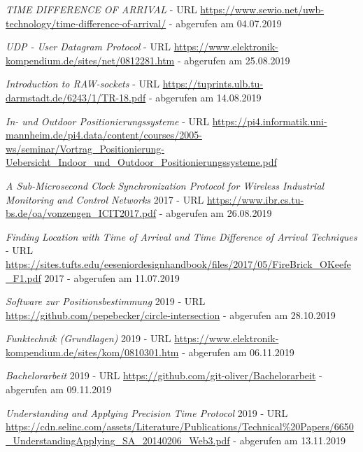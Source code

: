 \begin{thebibliography}{}
	\textit{TIME DIFFERENCE OF ARRIVAL} - URL \url{https://www.sewio.net/uwb-technology/time-difference-of-arrival/} - abgerufen am 04.07.2019	


	\textit{UDP - User Datagram Protocol} - URL \url{https://www.elektronik-kompendium.de/sites/net/0812281.htm} - abgerufen am 25.08.2019	

	\textit{Introduction to RAW-sockets} - URL \url{https://tuprints.ulb.tu-darmstadt.de/6243/1/TR-18.pdf} - abgerufen am 14.08.2019	

	\textit{In- und Outdoor
Positionierungssysteme} - URL \url{https://pi4.informatik.uni-mannheim.de/pi4.data/content/courses/2005-ws/seminar/Vortrag_Positionierung-Uebersicht_Indoor_und_Outdoor_Positionierungssysteme.pdf} 

	\textit{A Sub-Microsecond Clock Synchronization Protocol for Wireless Industrial Monitoring and Control Networks} 2017 - URL \url{https://www.ibr.cs.tu-bs.de/oa/vonzengen_ICIT2017.pdf} - abgerufen am 26.08.2019

 
	\textit{Finding Location with Time of Arrival and Time Difference of Arrival Techniques} - URL \url{https://sites.tufts.edu/eeseniordesignhandbook/files/2017/05/FireBrick_OKeefe_F1.pdf} 2017 - abgerufen am 11.07.2019	
	


	\textit{Software zur Positionsbestimmung} 2019 - URL \url{https://github.com/pepebecker/circle-intersection} - abgerufen am 28.10.2019	
	
	
	\textit{Funktechnik (Grundlagen)} 2019 - URL \url{https://www.elektronik-kompendium.de/sites/kom/0810301.htm} - abgerufen am 06.11.2019	
	
\textit{Bachelorarbeit} 2019 - URL \url{https://github.com/git-oliver/Bachelorarbeit} - abgerufen am 09.11.2019	
	
\textit{Understanding and Applying Precision Time Protocol} 2019 - URL \url{https://cdn.selinc.com/assets/Literature/Publications/Technical\%20Papers/6650_UnderstandingApplying_SA_20140206_Web3.pdf} - abgerufen am 13.11.2019		
	

	
	
	
	
\end{thebibliography}
